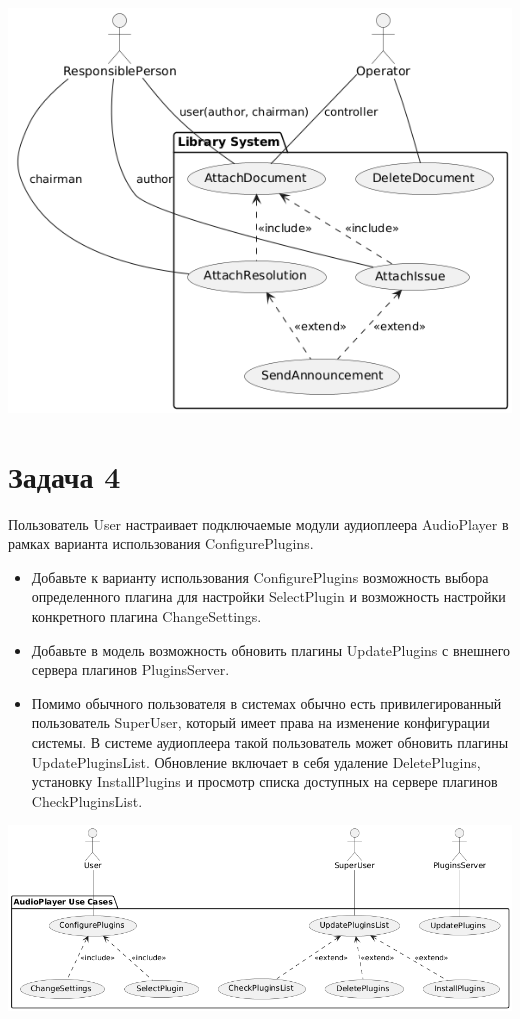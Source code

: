 \documentclass{article}
\begin{document}
\includegraphics[width=\textwidth]{3.png}

\section{Задача 4}
Пользователь User настраивает подключаемые модули аудиоплеера AudioPlayer в рамках варианта использования ConfigurePlugins.

\begin{itemize}
    \item Добавьте к варианту использования ConfigurePlugins возможность выбора определенного плагина для настройки SelectPlugin и возможность настройки конкретного плагина ChangeSettings. 
    \item Добавьте в модель возможность обновить плагины UpdatePlugins с внешнего сервера плагинов PluginsServer.
    \item Помимо обычного пользователя в системах обычно есть привилегированный пользователь SuperUser, который имеет права на изменение конфигурации системы. В системе аудиоплеера такой пользователь может обновить плагины UpdatePluginsList. Обновление включает в себя удаление DeletePlugins, установку InstallPlugins и просмотр списка доступных на сервере плагинов CheckPluginsList.
\end{itemize}

\includegraphics[width=\textwidth]{4.png}
\end{document}

